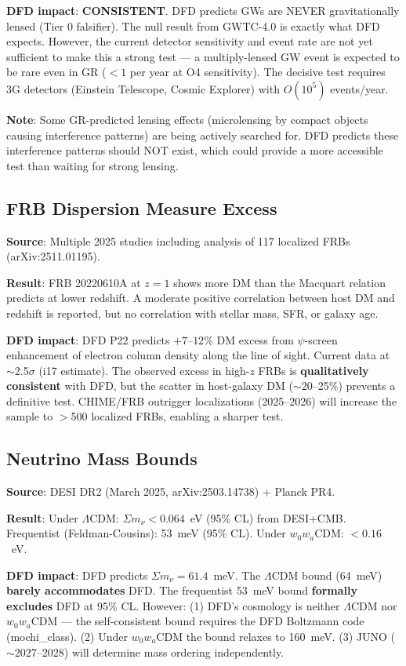 \documentclass[11pt]{article}
\begin{document}
\textbf{DFD impact}: \textbf{CONSISTENT}. DFD predicts GWs are NEVER gravitationally lensed (Tier 0 falsifier). The null result from GWTC-4.0 is exactly what DFD expects. However, the current detector sensitivity and event rate are not yet sufficient to make this a strong test --- a multiply-lensed GW event is expected to be rare even in GR ($<1$ per year at O4 sensitivity). The decisive test requires 3G detectors (Einstein Telescope, Cosmic Explorer) with $O(10^5)$ events/year.

\textbf{Note}: Some GR-predicted lensing effects (microlensing by compact objects causing interference patterns) are being actively searched for. DFD predicts these interference patterns should NOT exist, which could provide a more accessible test than waiting for strong lensing.

\subsection{FRB Dispersion Measure Excess}

\textbf{Source}: Multiple 2025 studies including analysis of 117 localized FRBs (arXiv:2511.01195).

\textbf{Result}: FRB 20220610A at $z = 1$ shows more DM than the Macquart relation predicts at lower redshift. A moderate positive correlation between host DM and redshift is reported, but no correlation with stellar mass, SFR, or galaxy age.

\textbf{DFD impact}: DFD P22 predicts $+7$--$12\%$ DM excess from $\psi$-screen enhancement of electron column density along the line of sight. Current data at $\sim$2.5$\sigma$ (i17 estimate). The observed excess in high-$z$ FRBs is \textbf{qualitatively consistent} with DFD, but the scatter in host-galaxy DM ($\sim$20--25\%) prevents a definitive test. CHIME/FRB outrigger localizations (2025--2026) will increase the sample to $>$500 localized FRBs, enabling a sharper test.

\subsection{Neutrino Mass Bounds}

\textbf{Source}: DESI DR2 (March 2025, arXiv:2503.14738) + Planck PR4.

\textbf{Result}: Under $\Lambda$CDM: $\Sigma m_\nu < 0.064$~eV (95\% CL) from DESI+CMB. Frequentist (Feldman-Cousins): 53~meV (95\% CL). Under $w_0w_a$CDM: $< 0.16$~eV.

\textbf{DFD impact}: DFD predicts $\Sigma m_\nu = 61.4$~meV. The $\Lambda$CDM bound (64~meV) \textbf{barely accommodates} DFD. The frequentist 53~meV bound \textbf{formally excludes} DFD at 95\% CL. However: (1) DFD's cosmology is neither $\Lambda$CDM nor $w_0w_a$CDM --- the self-consistent bound requires the DFD Boltzmann code (mochi\_class). (2) Under $w_0w_a$CDM the bound relaxes to 160~meV. (3) JUNO ($\sim$2027--2028) will determine mass ordering independently.
\end{document}
